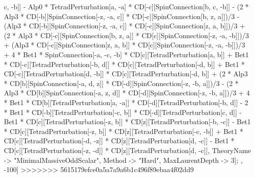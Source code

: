 c, -b]] - Alp0 * TetradPerturbation[a, -a] * CD[-c][SpinConnection[b, c, -b]] - (2 * Alp3 * CD[-b][SpinConnection[-z, -a, c]] * CD[-c][SpinConnection[b, z, a]])/3 - (Alp3 * CD[-b][SpinConnection[-z, -a, c]] * CD[-c][SpinConnection[z, a, b]])/3 + (2 * Alp3 * CD[-c][SpinConnection[b, z, a]] * CD[c][SpinConnection[-z, -a, -b]])/3 + (Alp3 * CD[-c][SpinConnection[z, a, b]] * CD[c][SpinConnection[-z, -a, -b]])/3 + 4 * Bet1 * SpinConnection[-a, -c, -b] * CD[c][TetradPerturbation[a, b]] + Bet1 * CD[-c][TetradPerturbation[-b, d]] * CD[c][TetradPerturbation[-d, b]] + Bet1 * CD[-c][TetradPerturbation[d, -b]] * CD[c][TetradPerturbation[-d, b]] + (2 * Alp3 * CD[b][SpinConnection[-a, d, z]] * CD[-d][SpinConnection[-z, -b, a]])/3 - (2 * Alp3 * CD[b][SpinConnection[-a, z, d]] * CD[-d][SpinConnection[-z, -b, a]])/3 + 4 * Bet1 * CD[b][TetradPerturbation[a, -a]] * CD[-d][TetradPerturbation[-b, d]] - 2 * Bet1 * CD[-b][TetradPerturbation[-c, b]] * CD[-d][TetradPerturbation[c, d]] - Bet1 * CD[c][TetradPerturbation[-z, b]] * CD[z][TetradPerturbation[-b, -c]] - Bet1 * CD[c][TetradPerturbation[-z, b]] * CD[z][TetradPerturbation[-c, -b]] + Bet1 * CD[c][TetradPerturbation[-d, -z]] * CD[z][TetradPerturbation[d, -c]] - Bet1 * CD[c][TetradPerturbation[-z, -d]] * CD[z][TetradPerturbation[d, -c]], TheoryName -> "MinimalMassiveOddScalar", Method -> "Hard", MaxLaurentDepth -> 3]; , -100]
>>>>>>> 5615179efce0a5a7a9a6b1c496f89ebaa4f02dd9
